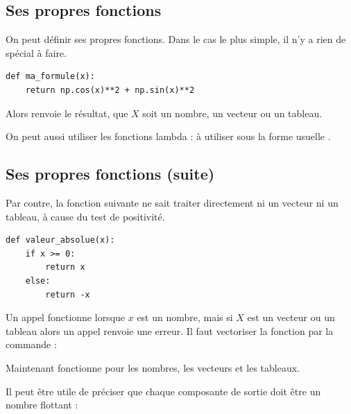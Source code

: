 \documentclass[11pt,class=report,crop=false]{standalone}
\begin{document}
\subsection{Ses propres fonctions}

On peut définir ses propres fonctions.
Dans le cas le plus simple, il n'y a rien de spécial à faire.

\begin{center}
\begin{minipage}{0.9\textwidth}
\begin{lstlisting}    
def ma_formule(x):
	return np.cos(x)**2 + np.sin(x)**2
\end{lstlisting}
\end{minipage}
\end{center}
Alors  renvoie le résultat, que $X$ soit un nombre, un vecteur ou un tableau.

On peut aussi utiliser les fonctions \og{}lambda\fg{} :
à utiliser sous la forme usuelle .


\subsection{Ses propres fonctions (suite)}

Par contre, la fonction suivante ne sait traiter directement ni un vecteur ni un tableau, à cause du test de positivité.
\begin{center}
\begin{minipage}{0.9\textwidth}
\begin{lstlisting} 
def valeur_absolue(x):
	if x >= 0:
		return x
	else:
		return -x
\end{lstlisting}
\end{minipage}
\end{center}


Un appel  fonctionne lorsque $x$ est un nombre, mais si $X$ est un vecteur ou un tableau alors un appel  renvoie une erreur. Il faut \og{}vectoriser\fg{} la fonction par la commande :

Maintenant  fonctionne pour les nombres, les vecteurs et les tableaux.

\begin{remarque*}
Il peut être utile de préciser que chaque composante de sortie doit être un nombre flottant :

\end{remarque*}
\end{document}
